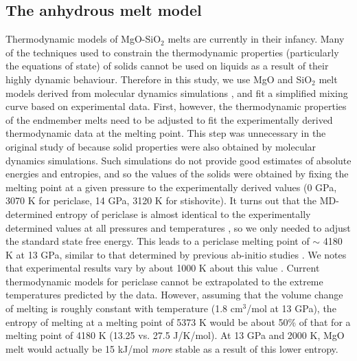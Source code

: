 \documentclass[review]{elsarticle}
\begin{document}
\subsection{The anhydrous melt model}
Thermodynamic models of MgO-SiO$_2$ melts are currently in their infancy. Many of the techniques used to constrain the thermodynamic properties (particularly the equations of state) of solids cannot be used on liquids as a result of their highly dynamic behaviour. Therefore in this study, we use MgO and SiO$_2$ melt models derived from molecular dynamics simulations \citep{DKS2013}, and fit a simplified mixing curve based on experimental data. First, however, the thermodynamic properties of the endmember melts need to be adjusted to fit the experimentally derived thermodynamic data at the melting point. This step was unnecessary in the original study of \cite{DKS2013} because solid properties were also obtained by molecular dynamics simulations. Such simulations do not provide good estimates of absolute energies and entropies, and so the values of the solids were obtained by fixing the melting point at a given pressure to the experimentally derived values (0 GPa, 3070 K for periclase, 14 GPa, 3120 K for stishovite). It turns out that the MD-determined entropy of periclase is almost identical to the experimentally determined values at all pressures and temperatures \citep{SLB2011}, so we only needed to adjust the standard state free energy. This leads to a periclase melting point of $\sim$ 4180 K at 13 GPa, similar to that determined by previous ab-initio studies \citep{Alfe2005}. We notes that experimental results vary by about 1000 K about this value \citep[3100 -- 5373 K at 13 GPa][]{ZB1994,ZF2008}. Current thermodynamic models for periclase cannot be extrapolated to the extreme temperatures predicted by the \cite{ZF2008} data. However, assuming that the volume change of melting is roughly constant with temperature (1.8 cm$^3$/mol at 13 GPa), the entropy of melting at a melting point of 5373 K would be about 50\% of that for a melting point of 4180 K (13.25 vs. 27.5 J/K/mol). At 13 GPa and 2000 K, MgO melt would actually be 15 kJ/mol \emph{more} stable as a result of this lower entropy.
\end{document}
